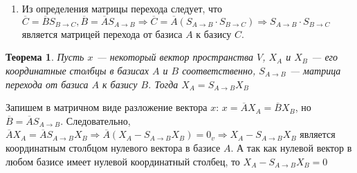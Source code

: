 \begin{enumerate}
\begin{Proof}
\begin{enumerate}
			\item Из определения матрицы перехода следует, что $\overline{C} = \overline{B}S_{B\rightarrow C}, \overline{B} = \overline{A}S_{A\rightarrow B}\Rightarrow\overline{C} = \overline{A}(S_{A\rightarrow B}\cdot S_{B\rightarrow C})\Rightarrow S_{A\rightarrow B}\cdot S_{B\rightarrow C}$ является матрицей перехода от базиса $A$ к базису $C$.
		\end{enumerate}
	\end{Proof}
\end{enumerate}
\newtheorem*{th8_1}{Теорема}\begin{th8_1} Пусть $x$ --- некоторый вектор пространства $V$, $X_A$ и $X_B$ --- его координатные столбцы в базисах $A$ и $B$ соответственно, $S_{A\rightarrow B}$ --- матрица перехода от базиса $A$ к базису $B$. Тогда $X_{A} = S_{A \rightarrow B}X_{B}$\end{th8_1}\begin{Proof}
	Запишем в матричном виде разложение вектора $x$: $x = \overline{A}X_A = \overline{B}X_B$, но $\overline{B} = \overline{A}S_{A\rightarrow B}$. Следовательно, $\overline{A}X_A = \overline{A}S_{A\rightarrow B}X_B\Rightarrow \overline{A}(X_A - S_{A\rightarrow B} X_B) = 0_v\Rightarrow X_A - S_{A\rightarrow B} X_B$ является координатным столбцом нулевого вектора в базисе $A$. А так как нулевой вектор в любом базисе имеет нулевой координатный столбец, то $X_A - S_{A\rightarrow B}X_B = 0$
\end{Proof}














